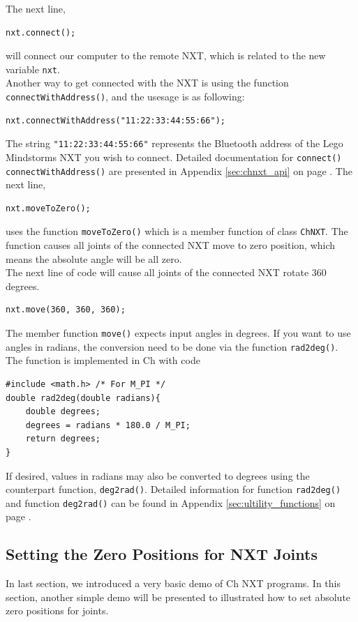 \documentclass[11pt]{article}
\begin{document}
\noindent
The next line,
\begin{verbatim}
nxt.connect();
\end{verbatim}
\noindent
will connect our computer to the remote NXT, which is related to the new variable \texttt{nxt}.\\
\newline
\noindent
Another way to get connected with the NXT is using the function \texttt{connectWithAddress()}, and the usesage
is as following:
\begin{verbatim}
nxt.connectWithAddress("11:22:33:44:55:66");
\end{verbatim}
\noindent
The string \texttt{"11:22:33:44:55:66"} represents the Bluetooth address of the Lego Mindstorms NXT you wish 
to connect. Detailed documentation for \texttt{connect()} \texttt{connectWithAddress()} are presented in 
Appendix \ref{sec:chnxt_api} on page \pageref{sec:chnxt_api}. The next line,
\begin{verbatim}
nxt.moveToZero();
\end{verbatim}
\noindent
uses the function \texttt{moveToZero()} which is a member function of class \texttt{ChNXT}. The function causes
all joints of the connected NXT move to zero position, which means the absolute angle will be all zero.\\
\newline
The next line of code will cause all joints of the connected NXT rotate 360 degrees.
\begin{verbatim}
nxt.move(360, 360, 360);
\end{verbatim}
\noindent
The member function \texttt{move()} expects input angles in degrees. If you want to use angles in radians, the 
conversion need to be done via the function \texttt{rad2deg()}. The function is implemented in Ch with code
\begin{verbatim}
#include <math.h> /* For M_PI */
double rad2deg(double radians){
    double degrees;
    degrees = radians * 180.0 / M_PI;
    return degrees;
}
\end{verbatim}
\noindent
If desired, values in radians may also be converted to degrees using the counterpart function, \texttt{deg2rad()}.
Detailed information for function \texttt{rad2deg()} and function \texttt{deg2rad()} can be found in Appendix 
\ref{sec:ultility_functions} on page \pageref{sec:ultility_functions}.\\

\subsection{\label{sec:setzero_demo}Setting the Zero Positions for NXT Joints}
In last section, we introduced a very basic demo of Ch NXT programs. In this section, another simple demo
will be presented to illustrated how to set absolute zero positions for joints.
\end{document}
